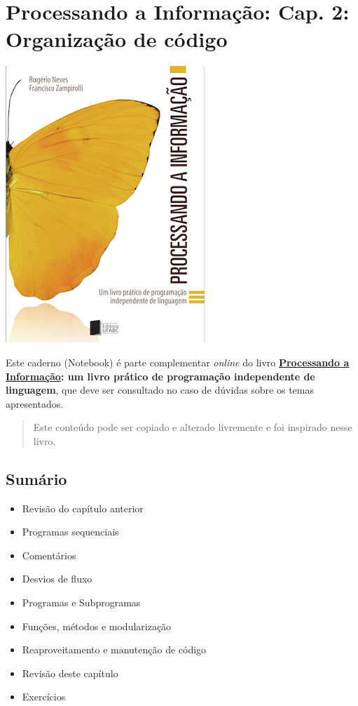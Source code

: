 \documentclass[12pt,a4paper]{article}
\providecommand{\tightlist}{%
      \setlength{\itemsep}{0pt}\setlength{\parskip}{0pt}}
\begin{document}
    \hypertarget{processando-a-informauxe7uxe3o-cap.-2-organizauxe7uxe3o-de-cuxf3digo}{%
\section{Processando a Informação: Cap. 2: Organização de
código}\label{processando-a-informauxe7uxe3o-cap.-2-organizauxe7uxe3o-de-cuxf3digo}}

    \includegraphics{"figs/Capa_Processando_Informacao.jpg"}

Este caderno (Notebook) é parte complementar \emph{online} do livro
\textbf{\href{https://editora.ufabc.edu.br/matematica-e-ciencias-da-computacao/58-processando-a-informacao}{Processando
a Informação}: um livro prático de programação independente de
linguagem}, que deve ser consultado no caso de dúvidas sobre os temas
apresentados.

\begin{quote}
Este conteúdo pode ser copiado e alterado livremente e foi inspirado
nesse livro.
\end{quote}

    \hypertarget{sumuxe1rio}{%
\subsection{Sumário}\label{sumuxe1rio}}

\begin{itemize}
\tightlist
\item
  Revisão do capítulo anterior
\item
  Programas sequenciais
\item
  Comentários
\item
  Desvios de fluxo
\item
  Programas e Subprogramas
\item
  Funções, métodos e modularização
\item
  Reaproveitamento e manutenção de código
\item
  Revisão deste capítulo
\item
  Exercícios
\end{itemize}
\end{document}
